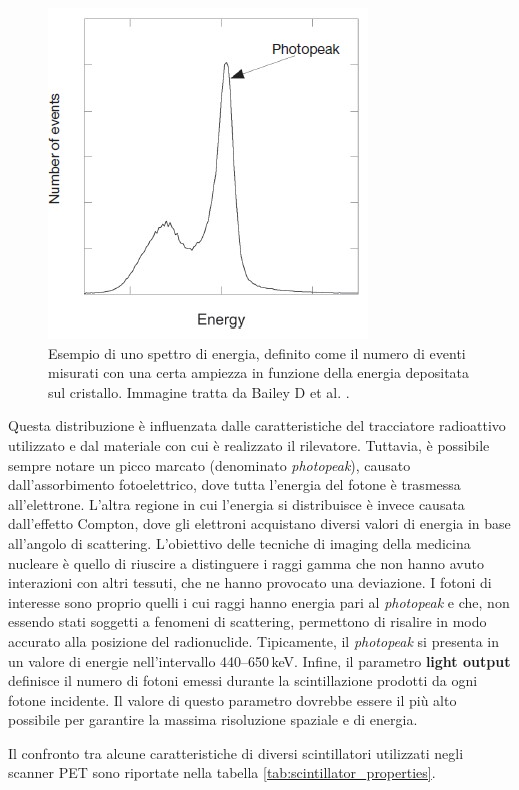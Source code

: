 \begin{figure}[h]
	\centering
	\includegraphics[width=0.4\linewidth]{./ImageFiles/Photo peak.jpg}
	\caption{Esempio di uno spettro di energia, definito come il numero di eventi misurati con una certa ampiezza in funzione della energia depositata sul cristallo. Immagine tratta da Bailey D et al. \cite{Bailey2014}.}
	\label{fig:photo_peak}
\end{figure}
Questa distribuzione è influenzata dalle caratteristiche del tracciatore radioattivo utilizzato e dal materiale con cui è realizzato il rilevatore. Tuttavia, è possibile sempre notare un picco marcato (denominato \textit{photopeak}), causato dall'assorbimento fotoelettrico, dove tutta l'energia del fotone è trasmessa all'elettrone. L'altra regione in cui l'energia si distribuisce è invece causata dall'effetto Compton, dove gli elettroni acquistano diversi valori di energia in base all'angolo di scattering. L'obiettivo delle tecniche di imaging della medicina nucleare è quello di riuscire a distinguere i raggi gamma che non hanno avuto interazioni con altri tessuti, che ne hanno provocato una deviazione. I fotoni di interesse sono proprio quelli i cui raggi \textgamma hanno energia pari al \textit{photopeak} e che, non essendo stati soggetti a fenomeni di scattering, permettono di risalire in modo accurato alla posizione del radionuclide. Tipicamente, il \textit{photopeak} si presenta in un valore di energie nell'intervallo \numrange[range-phrase=--]{440}{650}\,\unit{\kilo\electronvolt}. Infine, il parametro \textbf{light output} definisce il numero di fotoni emessi durante la scintillazione prodotti da ogni fotone incidente. Il valore di questo parametro dovrebbe essere il più alto possibile per garantire la massima risoluzione spaziale e di energia.

\noindent
Il confronto tra alcune caratteristiche di diversi scintillatori utilizzati negli scanner PET sono riportate nella tabella \ref{tab:scintillator_properties}.

